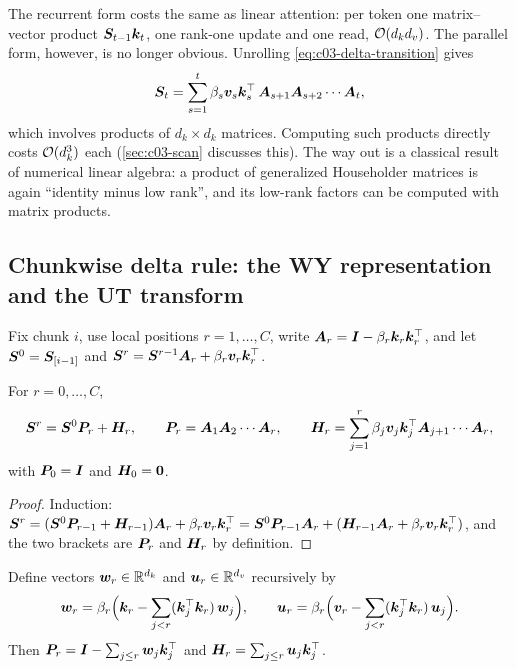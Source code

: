 The recurrent form costs the same as linear attention: per token one matrix--vector product
$\bm{S}_{t-1}\bm{k}_t$, one rank-one update and one read, $\mathcal{O}(d_kd_v)$. The parallel form, however,
is no longer obvious. Unrolling \cref{eq:c03-delta-transition} gives
\begin{equation}\label{eq:c03-delta-unroll}
  \bm{S}_t=\sum_{s=1}^{t}\beta_s\bm{v}_s\bm{k}_s^{\top}\,\bm{A}_{s+1}\bm{A}_{s+2}\cdots\bm{A}_t ,
\end{equation}
which involves products of $d_k\times d_k$ matrices. Computing such products directly costs
$\mathcal{O}(d_k^3)$ each (\cref{sec:c03-scan} discusses this). The way out is a classical result of
numerical linear algebra: a product of generalized Householder matrices is again ``identity
minus low rank'', and its low-rank factors can be computed with matrix products.

\subsection{Chunkwise delta rule: the WY representation and the UT transform}\label{sec:c03-wy}

Fix chunk $i$, use local positions $r=1,\dots,C$, write $\bm{A}_r=\bm{I}-\beta_r\bm{k}_r\bm{k}_r^{\top}$, and
let $\bm{S}^{0}=\bm{S}_{[i-1]}$ and $\bm{S}^{r}=\bm{S}^{r-1}\bm{A}_r+\beta_r\bm{v}_r\bm{k}_r^{\top}$.

\begin{lemma}\label{lem:c03-delta-unroll}
For $r=0,\dots,C$,
\[
  \bm{S}^{r}=\bm{S}^{0}\bm{P}_r+\bm{H}_r,\qquad
  \bm{P}_r=\bm{A}_1\bm{A}_2\cdots\bm{A}_r,\qquad
  \bm{H}_r=\sum_{j=1}^{r}\beta_j\bm{v}_j\bm{k}_j^{\top}\bm{A}_{j+1}\cdots\bm{A}_r ,
\]
with $\bm{P}_0=\bm{I}$ and $\bm{H}_0=\bm 0$.
\end{lemma}

\begin{proof}
Induction: $\bm{S}^{r}=(\bm{S}^0\bm{P}_{r-1}+\bm{H}_{r-1})\bm{A}_r+\beta_r\bm{v}_r\bm{k}_r^{\top}
=\bm{S}^0\bm{P}_{r-1}\bm{A}_r+(\bm{H}_{r-1}\bm{A}_r+\beta_r\bm{v}_r\bm{k}_r^{\top})$, and the two brackets are $\bm{P}_r$
and $\bm{H}_r$ by definition.
\end{proof}

\begin{lemma}[WY representation]\label{lem:c03-wy}
Define vectors $\bm{w}_r\in\mathbb{R}^{d_k}$ and $\bm{u}_r\in\mathbb{R}^{d_v}$ recursively by
\begin{equation}\label{eq:c03-wy-rec}
  \bm{w}_r=\beta_r\Big(\bm{k}_r-\sum_{j<r}(\bm{k}_j^{\top}\bm{k}_r)\,\bm{w}_j\Big),\qquad
  \bm{u}_r=\beta_r\Big(\bm{v}_r-\sum_{j<r}(\bm{k}_j^{\top}\bm{k}_r)\,\bm{u}_j\Big).
\end{equation}
Then $\bm{P}_r=\bm{I}-\sum_{j\le r}\bm{w}_j\bm{k}_j^{\top}$ and $\bm{H}_r=\sum_{j\le r}\bm{u}_j\bm{k}_j^{\top}$.
\end{lemma}

